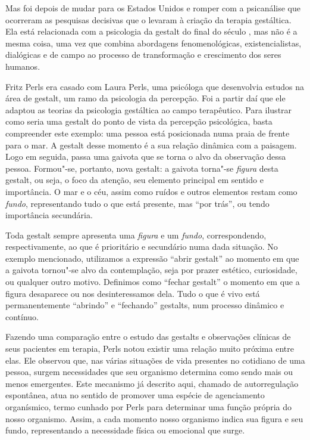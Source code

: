 Mas foi depois de mudar para os Estados Unidos e romper com a
psicanálise que ocorreram as pesquisas decisivas que o levaram à criação
da terapia gestáltica. Ela está relacionada com a psicologia da gestalt do final do século , mas não é a mesma coisa, uma vez que combina abordagens fenomenológicas, existencialistas, dialógicas e de campo ao processo de transformação e crescimento dos seres humanos.

Fritz Perls era casado com Laura Perls, uma psicóloga que desenvolvia estudos na área de gestalt, um
ramo da psicologia da percepção. Foi a partir daí que ele adaptou as
teorias da psicologia gestáltica ao campo terapêutico. Para ilustrar
como seria uma gestalt do ponto de vista da percepção psicológica, basta
compreender este exemplo: uma pessoa está posicionada numa praia de
frente para o mar. A gestalt desse momento é a sua relação dinâmica com
a paisagem. Logo em seguida, passa uma gaivota que se torna o alvo da
observação dessa pessoa. Formou"-se, portanto, nova gestalt: a gaivota
torna"-se \emph{figura} desta gestalt, ou seja, o foco da atenção, seu
elemento principal em sentido e importância. O mar e o céu, assim como
ruídos e outros elementos restam como \emph{fundo}, representando tudo o
que está presente, mas ``por trás'', ou tendo importância secundária.

Toda gestalt sempre apresenta uma \emph{figura} e um \emph{fundo},
correspondendo, respectivamente, ao que é prioritário e secundário numa
dada situação. No exemplo mencionado, utilizamos a expressão ``abrir
gestalt'' ao momento em que a gaivota tornou"-se alvo da contemplação,
seja por prazer estético, curiosidade, ou qualquer outro motivo.
Definimos como ``fechar gestalt'' o momento em que a figura desaparece
ou nos desinteressamos dela. Tudo o que é vivo está permanentemente
``abrindo'' e ``fechando'' gestalts, num processo dinâmico e contínuo.

Fazendo uma comparação entre o estudo das gestalts e observações
clínicas de seus pacientes em terapia, Perls notou existir uma relação
muito próxima entre elas. Ele observou que, nas várias situações de vida
presentes no cotidiano de uma pessoa, surgem necessidades que seu
organismo determina como sendo mais ou menos emergentes. Este mecanismo
já descrito aqui, chamado de autorregulação espontânea, atua no sentido
de promover uma espécie de agenciamento organísmico, termo cunhado por
Perls para determinar uma função própria do nosso organismo. Assim, a
cada momento nosso organismo indica sua figura e seu fundo,
representando a necessidade física ou emocional que surge.

